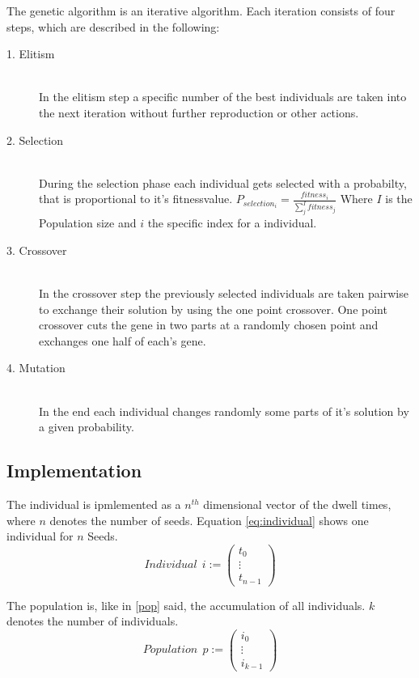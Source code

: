 \documentclass[12pt]{article}
\begin{document}
The genetic algorithm is an iterative algorithm. Each iteration consists of four steps, which are described in the following:

\begin{description}
\item[1. Elitism]~\\
In the elitism step a specific number of the best individuals are taken into the next iteration without further reproduction or other actions. 
\item[2. Selection]~\\
During the selection phase each individual gets selected with a probabilty, that is proportional to it's fitnessvalue.
$P_{selection_{i}}= \tfrac{fitness_{i}}{\sum_{j}^I fitness_{j}}$ Where $I$ is the Population size and $i$ the specific index for a individual.
\item[3. Crossover]~\\
In the crossover step the previously selected individuals are taken pairwise to exchange their solution by using the one point crossover. One point crossover cuts the gene in two parts at a randomly chosen point and exchanges one half of each's gene.



\item[4. Mutation]~\\
In the end each individual changes randomly some parts of it's solution by a given probability.
\end{description}

\subsection{Implementation}
\label{subsec:impl}

The individual is ipmlemented as a $n^{th}$ dimensional vector of the dwell times, where $n$ denotes the number of seeds. Equation \eqref{eq:individual} shows one individual for $n  $ Seeds.
 \begin{equation}
 \label{eq:individual}
 Individual \ \ i := \begin{pmatrix}
 t_{0} \\ \vdots \\ t_{n-1} 	
\end{pmatrix}   
\end{equation} 
 
 The population is, like in \ref{pop} said, the accumulation of all individuals. $k$ denotes the number of individuals.
\begin{equation}
 \label{eq:population}
 Population \ \ p := \begin{pmatrix}
 i_{0} \\ \vdots \\ i_{k-1} 	
\end{pmatrix}   
 \end{equation}
 
\end{document}
